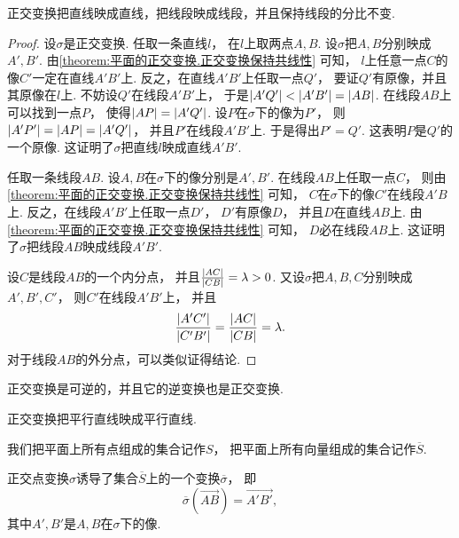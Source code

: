 \begin{property}
正交变换把直线映成直线，把线段映成线段，并且保持线段的分比不变.
\begin{proof}
设\(\sigma\)是正交变换.
任取一条直线\(l\)，
在\(l\)上取两点\(A,B\).
设\(\sigma\)把\(A,B\)分别映成\(A',B'\).
由\cref{theorem:平面的正交变换.正交变换保持共线性} 可知，
\(l\)上任意一点\(C\)的像\(C'\)一定在直线\(A'B'\)上.
反之，在直线\(A'B'\)上任取一点\(Q'\)，
要证\(Q'\)有原像，并且其原像在\(l\)上.
不妨设\(Q'\)在线段\(A'B'\)上，
于是\(
	\abs{A'Q'}
	< \abs{A'B'}
	= \abs{AB}
\).
在线段\(AB\)上可以找到一点\(P\)，
使得\(
	\abs{AP}
	= \abs{A'Q'}
\).
设\(P\)在\(\sigma\)下的像为\(P'\)，
则\(
	\abs{A'P'}
	= \abs{AP}
	= \abs{A'Q'}
\)，
并且\(P'\)在线段\(A'B'\)上.
于是得出\(P'=Q'\).
这表明\(P\)是\(Q'\)的一个原像.
这证明了\(\sigma\)把直线\(l\)映成直线\(A'B'\).

任取一条线段\(AB\).
设\(A,B\)在\(\sigma\)下的像分别是\(A',B'\).
在线段\(AB\)上任取一点\(C\)，
则由\cref{theorem:平面的正交变换.正交变换保持共线性} 可知，
\(C\)在\(\sigma\)下的像\(C'\)在线段\(A'B\)上.
反之，在线段\(A'B'\)上任取一点\(D'\)，
\(D'\)有原像\(D\)，
并且\(D\)在直线\(AB\)上.
由\cref{theorem:平面的正交变换.正交变换保持共线性} 可知，
\(D\)必在线段\(AB\)上.
这证明了\(\sigma\)把线段\(AB\)映成线段\(A'B'\).

设\(C\)是线段\(AB\)的一个内分点，
并且\(\frac{\abs{AC}}{\abs{CB}} = \lambda > 0\).
又设\(\sigma\)把\(A,B,C\)分别映成\(A',B',C'\)，
则\(C'\)在线段\(A'B'\)上，
并且\begin{equation*}
	\frac{\abs{A'C'}}{\abs{C'B'}}
	= \frac{\abs{AC}}{\abs{CB}}
	= \lambda.
\end{equation*}
对于线段\(AB\)的外分点，可以类似证得结论.
\end{proof}
\end{property}

\begin{property}
正交变换是可逆的，并且它的逆变换也是正交变换.
\end{property}

\begin{property}
正交变换把平行直线映成平行直线.
\end{property}

我们把平面上所有点组成的集合记作\(S\)，
把平面上所有向量组成的集合记作\(\overline{S}\).
\begin{property}
正交点变换\(\sigma\)诱导了集合\(\overline{S}\)上的一个变换\(\overline{\sigma}\)，
即\begin{equation*}
	\overline{\sigma}(\vec{AB}) = \vec{A'B'},
\end{equation*}
其中\(A',B'\)是\(A,B\)在\(\sigma\)下的像.
\end{property}

